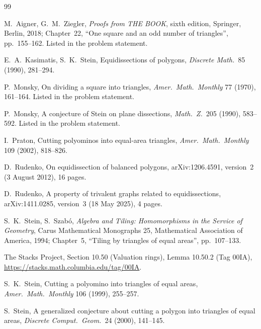 \documentclass[11pt]{article}
\theoremstyle{definition}
\begin{document}
\begin{thebibliography}{99}
\small

 M.~Aigner, G.~M.~Ziegler, \emph{Proofs from THE BOOK}, sixth edition, Springer, Berlin,
2018; Chapter~22, ``One square and an odd number of triangles'', pp.~155--162. Listed in the
problem statement.

 E.~A.~Kasimatis, S.~K.~Stein, Equidissections of polygons, \emph{Discrete Math.}\ 85
(1990), 281--294.

 P.~Monsky, On dividing a square into triangles, \emph{Amer.\ Math.\ Monthly} 77
(1970), 161--164. Listed in the problem statement.

 P.~Monsky, A conjecture of Stein on plane dissections, \emph{Math.\ Z.}\ 205 (1990),
583--592. Listed in the problem statement.

 I.~Praton, Cutting polyominos into equal-area triangles, \emph{Amer.\ Math.\ Monthly}
109 (2002), 818--826.

 D.~Rudenko, On equidissection of balanced polygons, arXiv:1206.4591, version~2
(3 August 2012), 16 pages.

 D.~Rudenko, A property of trivalent graphs related to equidissections,
arXiv:1411.0285, version~3 (18 May 2025), 4 pages.

 S.~K.~Stein, S.~Szab\'o, \emph{Algebra and Tiling: Homomorphisms in the Service of
Geometry}, Carus Mathematical Monographs 25, Mathematical Association of America, 1994; Chapter~5,
``Tiling by triangles of equal areas'', pp.~107--133.

 The Stacks Project, Section 10.50 (Valuation rings), Lemma 10.50.2 (Tag 00IA),
\url{https://stacks.math.columbia.edu/tag/00IA}.

 S.~K.~Stein, Cutting a polyomino into triangles of equal areas, \emph{Amer.\ Math.\
Monthly} 106 (1999), 255--257.

 S.~Stein, A generalized conjecture about cutting a polygon into triangles of equal
areas, \emph{Discrete Comput.\ Geom.}\ 24 (2000), 141--145.

\end{thebibliography}
\end{document}
